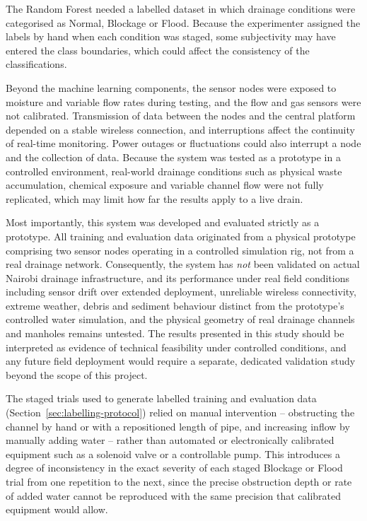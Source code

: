 \documentclass[12pt, a4paper]{article}
\begin{document}
The Random Forest needed a labelled dataset in which drainage conditions were categorised as Normal, Blockage or Flood. Because the experimenter assigned the labels by hand when each condition was staged, some subjectivity may have entered the class boundaries, which could affect the consistency of the classifications.

Beyond the machine learning components, the sensor nodes were exposed to moisture and variable flow rates during testing, and the flow and gas sensors were not calibrated. Transmission of data between the nodes and the central platform depended on a stable wireless connection, and interruptions affect the continuity of real-time monitoring. Power outages or fluctuations could also interrupt a node and the collection of data. Because the system was tested as a prototype in a controlled environment, real-world drainage conditions such as physical waste accumulation, chemical exposure and variable channel flow were not fully replicated, which may limit how far the results apply to a live drain.

Most importantly, this system was developed and evaluated strictly as a prototype. All training and evaluation data originated from a physical prototype comprising two sensor nodes operating in a controlled simulation rig, not from a real drainage network. Consequently, the system has \emph{not} been validated on actual Nairobi drainage infrastructure, and its performance under real field conditions including sensor drift over extended deployment, unreliable wireless connectivity, extreme weather, debris and sediment behaviour distinct from the prototype's controlled water simulation, and the physical geometry of real drainage channels and manholes remains untested. The results presented in this study should be interpreted as evidence of technical feasibility under controlled conditions, and any future field deployment would require a separate, dedicated validation study beyond the scope of this project.
 
The staged trials used to generate labelled training and evaluation data (Section~\ref{sec:labelling-protocol}) relied on manual intervention -- obstructing the channel by hand or with a repositioned length of pipe, and increasing inflow by manually adding water -- rather than automated or electronically calibrated equipment such as a solenoid valve or a controllable pump. This introduces a degree of inconsistency in the exact severity of each staged Blockage or Flood trial from one repetition to the next, since the precise obstruction depth or rate of added water cannot be reproduced with the same precision that calibrated equipment would allow.
\end{document}
